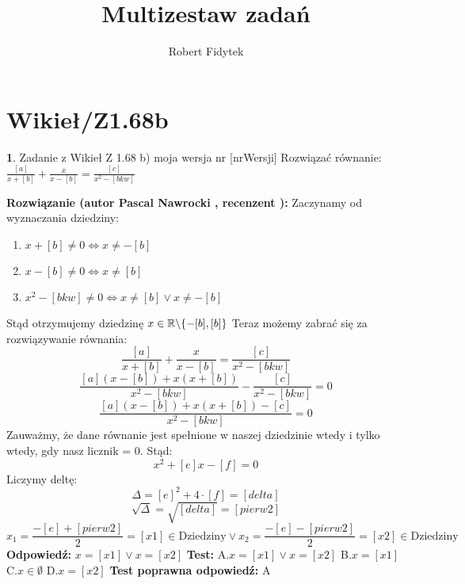 \documentclass[12pt, a4paper]{article}
\title{Multizestaw zadań}
\author{Robert Fidytek}
\date{}
\theoremstyle{definition} %
\newtheorem{zad}{}
\newcommand{\kategoria}[1]{\section{#1}} %
\newcommand{\zadStart}[1]{\begin{zad}#1\newline} %
\newcommand{\zadStop}{\end{zad}}   %
\newcommand{\rozwStart}[2]{\noindent \textbf{Rozwiązanie (autor #1 , recenzent #2): }\newline} %
\newcommand{\odpStart}{\noindent \textbf{Odpowiedź:}\newline}    %
\newcommand{\odpStop}{\newline}                                             %
\newcommand{\testStart}{\noindent \textbf{Test:}\newline} %
\newcommand{\testStop}{\newline} %
\newcommand{\kluczStart}{\noindent \textbf{Test poprawna odpowiedź:}\newline} %
\newcommand{\kluczStop}{\newline} %
\begin{document}
\maketitle


\kategoria{Wikieł/Z1.68b}
\zadStart{Zadanie z Wikieł Z 1.68 b) moja wersja nr [nrWersji]}
Rozwiązać równanie: $\frac{[a]}{x+[b]}+\frac{x}{x-[b]}=\frac{[c]}{x^2-[bkw]}$
\zadStop
\rozwStart{Pascal Nawrocki}{}
Zaczynamy od wyznaczania dziedziny:
\begin{enumerate}
\item $x+[b]\neq0 \Leftrightarrow x\neq-[b]$
\item $x-[b] \neq0 \Leftrightarrow x\neq[b]$
\item $x^2-[bkw]\neq0 \Leftrightarrow x\neq[b] \vee x\neq-[b]$
\end{enumerate}
Stąd otrzymujemy dziedzinę $x\in\mathbb{R}\symbol{92}\{-[b],[b]\}$
Teraz możemy zabrać się za rozwiązywanie równania:
$$\frac{[a]}{x+[b]}+\frac{x}{x-[b]}=\frac{[c]}{x^2-[bkw]}$$
$$\frac{[a](x-[b])+x(x+[b])}{x^2-[bkw]}-\frac{[c]}{x^2-[bkw]}=0$$
$$\frac{[a](x-[b])+x(x+[b])-[c]}{x^2-[bkw]}=0$$
Zauważmy, że dane równanie jest spełnione w naszej dziedzinie wtedy i tylko wtedy, gdy nasz licznik = 0. Stąd:
$$x^2+[e]x-[f]=0$$
Liczymy deltę:
$$\Delta=[e]^2+4\cdot[f]=[delta]$$
$$\sqrt{\Delta}=\sqrt{[delta]}=[pierw2]$$
$$x_1=\frac{-[e]+[pierw2]}{2}=[x1]\in\text{Dziedziny} \vee x_2=\frac{-[e]-[pierw2]}{2}=[x2]\in\text{Dziedziny}$$
\odpStart
$x=[x1] \vee x=[x2]$
\odpStop
\testStart
A.$x=[x1] \vee x=[x2]$
B.$x=[x1]$
C.$x\in\emptyset$
D.$x=[x2]$
\testStop
\kluczStart
A
\kluczStop
\end{document}
